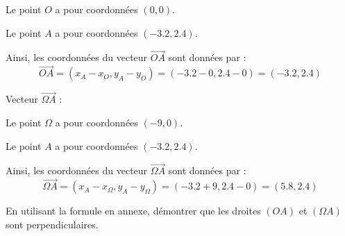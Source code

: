 \documentclass[answers]{exam}
\begin{document}
\begin{questions}
\begin{solution}
\begin{compactitem}
    \item Le point $O$ a pour coordonnées $(0, 0)$.
    \item Le point $A$ a pour coordonnées $(-3.2, 2.4)$.
\end{compactitem}

Ainsi, les coordonnées du vecteur $\overrightarrow{OA}$ sont données par :
\[
\overrightarrow{OA} = (x_A - x_O, y_A - y_O) = (-3.2 - 0, 2.4 - 0) = (-3.2, 2.4)
\]

\item 
Vecteur $\overrightarrow{\Omega A}$ :

\begin{compactitem}
    \item Le point $\Omega$ a pour coordonnées $(-9, 0)$.
    \item Le point $A$ a pour coordonnées $(-3.2, 2.4)$.
\end{compactitem}

Ainsi, les coordonnées du vecteur $\overrightarrow{\Omega A}$ sont données par :
\[
\overrightarrow{\Omega A} = (x_A - x_\Omega, y_A - y_\Omega) = (-3.2 + 9, 2.4 - 0) = (5.8, 2.4)
\]



\end{solution}

\question[1] En utilisant la formule en annexe, démontrer que les droites $(OA)$ et $(\Omega A)$ sont perpendiculaires.
\end{questions}
\end{document}
